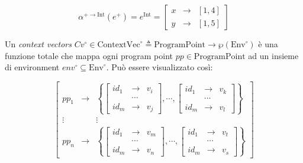 \documentclass{article}
\newcommand{\envcirc}{\textrm{Env}^{\circ}}
\begin{document}
\[
  \alpha^{+\rightarrow \textrm{Int}}(e^+) =
  e^{\textrm{Int}} = 
  \left[
  \begin{array}{ccc}
  x &\longrightarrow &[1,4] \\
  y &\longrightarrow &[1,5]
  \end{array}
  \right]
\]

\begin{center}
\end{center}

Un \textit{context vectors} \(Cv^{\circ}\in\textrm{ContextVec}^{\circ}\triangleq\textrm{ProgramPoint}\rightarrow\wp(\envcirc)\) è una funzione totale che mappa ogni program point \(pp\in\textrm{ProgramPoint}\) ad un insieme di environment \(env^{\circ}\subseteq\envcirc\). Può essere visualizzato così:

\[
  \left[
  \begin{array}{ccc}
  pp_1 &\longrightarrow &
  	\left\{
  	\left[
  	\begin{array}{ccc}
  	id_1 &\longrightarrow &v_i \\
  	     &\cdots \\
  	id_m &\longrightarrow &v_j
  	\end{array}
  	\right], 
  	\cdots ,
  	\left[
  	\begin{array}{ccc}
  	id_1 &\longrightarrow &v_k \\
  	     &\cdots \\
  	id_m &\longrightarrow &v_l
  	\end{array}
  	\right] 
  	\right\}
   \\
    \vdots & &\vdots 
   \\
  pp_n &\longrightarrow &
  	\left\{
  	\left[
  	\begin{array}{ccc}
  	id_1 &\longrightarrow &v_m \\
  	     &\cdots \\
  	id_m &\longrightarrow &v_n
  	\end{array}
  	\right], 
  	\cdots ,
  	\left[
  	\begin{array}{ccc}
  	id_1 &\longrightarrow &v_t \\
  	     &\cdots \\
  	id_m &\longrightarrow &v_s
  	\end{array}
  	\right] 
  	\right\}
  \end{array}
  \right]
\]
\end{document}
